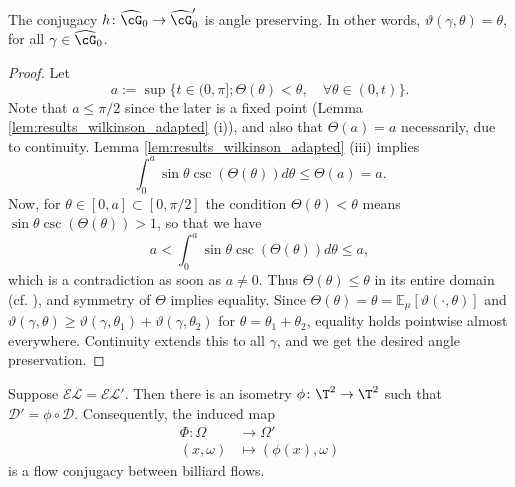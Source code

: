 \documentclass[reqno,11pt]{amsart}
\begin{document}
\begin{lemma}
    The conjugacy \(h\colon\widehat{\cG}_0 \to \widehat{\cG}_0'\) is angle preserving. 
    In other words, $\vartheta(\gamma, \theta) = \theta$, for all $\gamma \in \widehat{\cG}_0$.
\end{lemma}
\begin{proof}
    Let
    \[
        a := \sup\{t \in (0, \pi]; \Theta(\theta) < \theta, \quad \forall \theta \in (0, t)\}.
    \]
    Note that \(a \leq \pi/2\) since the later is a fixed point (Lemma \ref{lem:results_wilkinson_adapted} (i)), and also that \(\Theta(a) = a\) necessarily, due to continuity.
    Lemma \ref{lem:results_wilkinson_adapted} (iii) implies
    \[
        \int_0^a\sin{\theta}\csc{(\Theta(\theta))}d\theta \leq \Theta(a) = a.
    \]
    Now, for \(\theta \in [0, a] \subset [0, \pi/2]\) the condition \(\Theta(\theta) < \theta\) means \(\sin{\theta}\csc{(\Theta(\theta))} > 1\), so that we have
    \[
        a < \int_0^a\sin{\theta}\csc{(\Theta(\theta))}d\theta \leq  a,
    \]
    which is a contradiction as soon as \(a \neq 0\).
    Thus \(\Theta(\theta) \leq \theta\) in its entire domain (cf. \cite[Proposition 4.4]{wilkinson_anosov}), and symmetry of \(\Theta\) implies equality. 
    Since \(\Theta(\theta) = \theta = \mathbb{E}_\mu[\vartheta(\cdot, \theta)]\) and \(\vartheta(\gamma, \theta) \geq \vartheta(\gamma, \theta_1) + \vartheta(\gamma, \theta_2)\) for \(\theta = \theta_1 + \theta_2\), equality holds pointwise almost everywhere. 
    Continuity extends this to all \(\gamma\), and we get the desired angle preservation.
\end{proof}
\begin{theorem}
    Suppose \( \mathcal{EL} = \mathcal{EL}' \).
    Then there is an isometry \( \phi\colon \T^2 \to \T^2 \) such that \( \mathcal{D}' = \phi \circ \mathcal{D} \).
    Consequently, the induced map
    \begin{align*}
        \Phi\colon \Omega &\to \Omega' \\
        (x, \omega) &\mapsto (\phi(x), \omega)
    \end{align*}
    is a flow conjugacy between billiard flows.
\end{theorem}
\end{document}
